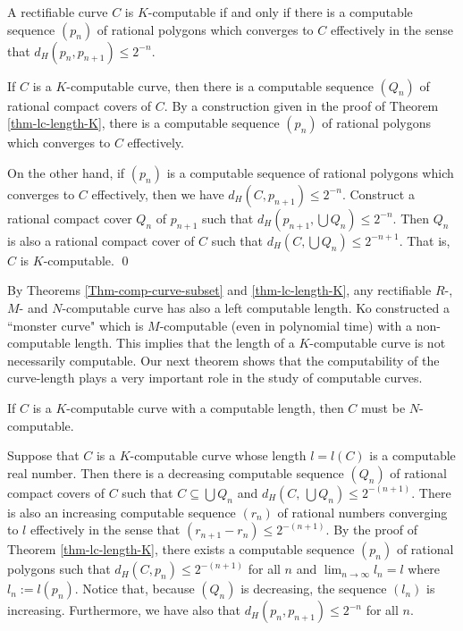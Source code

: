\documentclass{LMCS}
\theoremstyle{plain}
\begin{document}
\begin{cor}\label{cor-K-equivalence}
A rectifiable curve $C$ is $K$-computable if and only if there is a computable sequence $(p_n)$ of rational polygons which converges to $C$ effectively in the sense that $d_H(p_n, p_{n+1}) \le 2^{-n}$.
\end{cor}
\proof
If $C$ is a $K$-computable curve, then there is a computable sequence $(Q_n)$ of rational compact covers of $C$. By a construction given in the proof of Theorem \ref{thm-lc-length-K}, there is a computable sequence $(p_n)$ of rational polygons which converges to $C$ effectively.

On the other hand, if $(p_n)$ is a computable sequence of rational polygons which converges to $C$ effectively, then we have $d_H(C, p_{n+1}) \le 2^{-n}$. Construct a rational compact cover $Q_n$ of $p_{n+1}$ such that $d_H(p_{n+1}, \bigcup Q_n) \le 2^{-n}$. Then $Q_n$ is also a rational compact cover of $C$ such that $d_H(C ,\bigcup Q_n) \le 2^{-n+1}$. That is, $C$ is $K$-computable.
\qed

By Theorems \ref{Thm-comp-curve-subset} and \ref{thm-lc-length-K}, any rectifiable  $R$-, $M$- and $N$-computable curve has also a left computable length. Ko \cite{Ko95a} constructed a ``monster curve" which is $M$-computable (even in polynomial time) with a non-computable length. This implies that the length of a $K$-computable curve is not necessarily computable. Our next theorem shows that the computability of the curve-length plays a very important role in the study of computable curves.

\begin{thm}\label{thm-K+compLengh}
If $C$ is a $K$-computable curve  with a computable length, then $C$ must be $N$-computable.
\end{thm}
\proof
Suppose that $C$ is a $K$-computable curve whose length $l =l(C)$ is a computable real number. Then there is a decreasing computable sequence $(Q_n)$ of rational compact covers of $C$ such that $C \subseteq \bigcup Q_n$ and $d_H(C,\, \bigcup Q_n) \le 2^{-(n+1)}$. There is also an increasing computable sequence $(r_n)$ of rational numbers converging to $l$ effectively in the sense that $(r_{n+1}-r_n) \le 2^{-(n+1)}$. By the proof of Theorem \ref{thm-lc-length-K}, there exists a computable sequence $(p_n)$ of rational polygons such that $d_H(C, p_n) \le 2^{-(n+1)}$ for all $n$ and $\lim_{n\to\infty} l_n = l$ where $l_n := l(p_n)$. Notice that, because $(Q_n)$ is decreasing, the sequence $(l_n)$ is increasing. Furthermore, we have also that $d_H(p_n, p_{n+1}) \le 2^{-n}$ for all $n$.
\end{document}
